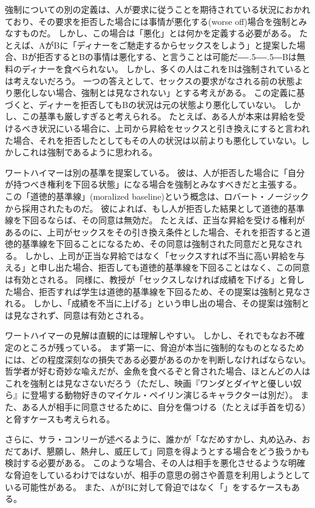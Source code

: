 \documentclass[paper=a4,book,openany]{jlreq}
\newcommand{\ig}[1]{}           %
\def\DDASH{―\kern-.5\zw―\kern-.5\zw―} %
\begin{document}
強制についての別の定義は、人が要求に従うことを期待されている状況におかれており、その要求を拒否した場合には事情が悪化する(worse off)場合を強制とみなすものだ。
しかし、この場合は「悪化」とは何かを定義する必要がある。
たとえば、AがBに「ディナーをご馳走するからセックスをしよう」と提案した場合、Bが拒否するとBの事情は悪化する、と言うことは可能だ{\DDASH}Bは無料のディナーを食べられない。
しかし、多くの人はこれをBは強制されているとは考えないだろう。
一つの答えとして、セックスの要求がなされる前の状態より悪化しない場合、強制とは見なされない」とする考えがある。
この定義に基づくと、ディナーを拒否してもBの状況は元の状態より悪化していない。
しかし、この基準も厳しすぎると考えられる。
たとえば、ある人が本来は昇給を受けるべき状況にいる場合に、上司から昇給をセックスと引き換えにすると言われた場合、それを拒否したとしてもその人の状況は以前よりも悪化していない。しかしこれは強制であるように思われる。

ワートハイマーは別の基準を提案している。
彼は、人が拒否した場合に「自分が持つべき権利を下回る状態」になる場合を強制とみなすべきだと主張する。
この「道徳的基準線」(moralized baseline)という概念は、ロバート・ノージック\ig{Robert Nozick}から採用されたものだ。
彼によれば、もし人が拒否した結果として道徳的基準線を下回るならば、その同意は無効だ\citep[pp.167--169]{wertheimer03:_consen_sexual_relat}。
たとえば、正当な昇給を受ける権利があるのに、上司がセックスをその引き換え条件とした場合、それを拒否すると道徳的基準線を下回ることになるため、その同意は強制された同意だと見なされる。
しかし、上司が正当な昇給ではなく「セックスすれば不当に高い昇給を与える」と申し出た場合、拒否しても道徳的基準線を下回ることはなく、この同意は有効とされる。
同様に、教授が「セックスしなければ成績を下げる」と脅した場合、拒否すれば学生は道徳的基準線を下回るため、その提案は強制と見なされる。
しかし、「成績を不当に上げる」という申し出の場合、その提案は強制とは見なされず、同意は有効とされる。

ワートハイマーの見解は直観的には理解しやすい。
しかし、それでもなお不確定のところが残っている。
まず第一に、脅迫が本当に強制的なものとなるためには、どの程度深刻なの損失である必要があるのかを判断しなければならない。
哲学者が好む奇妙な喩えだが、金魚を食べるぞと脅された場合、ほとんどの人はこれを強制とは見なさないだろう（ただし、映画『ワンダとダイヤと優しい奴ら』に登場する動物好きのマイケル・ペイリン演じるキャラクターは別だ）。
また、ある人が相手に同意させるために、自分を傷つける（たとえば手首を切る）と脅すケースも考えられる\citep[p.280]{husak06:_compl_guide_consen_sex}。

さらに、サラ・コンリーが述べるように、誰かが「なだめすかし、丸め込み、おだてあげ、懇願し、熱弁し、威圧して」同意を得ようとする場合をどう扱うかも検討する必要がある\citep[p.115]{conly04:seductionrapecoercion}。
このような場合、その人は相手を悪化させるような明確な脅迫をしているわけではないが、相手の意思の弱さや善意を利用しようとしている可能性がある。
また、AがBに対して脅迫ではなく「」をするケースもある。
\end{document}
